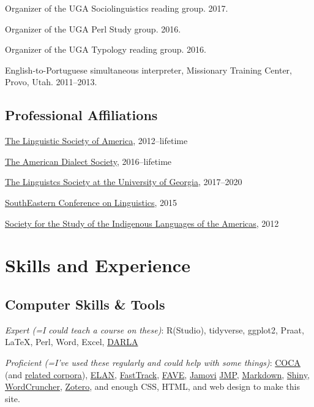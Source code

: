 \documentclass[
]{article}
\begin{document}
Organizer of the UGA Sociolinguistics reading group. 2017.

Organizer of the UGA Perl Study group. 2016.

Organizer of the UGA Typology reading group. 2016.

English-to-Portuguese simultaneous interpreter, Missionary Training
Center, Provo, Utah. 2011--2013.

\hypertarget{professional-affiliations}{%
\subsection{Professional Affiliations}\label{professional-affiliations}}

\href{http://www.linguisticsociety.org}{The Linguistic Society of
America}, 2012--lifetime

\href{http://www.americandialect.org}{The American Dialect Society},
2016--lifetime

\href{https://www.linguistics.uga.edu/lsuga}{The Linguistcs Society at
the University of Georgia}, 2017--2020

\href{http://secol.org}{SouthEastern Conference on Linguistics}, 2015

\href{http://www.ssila.org}{Society for the Study of the Indigenous
Languages of the Americas}, 2012

\hypertarget{skills-and-experience}{%
\section{Skills and Experience}\label{skills-and-experience}}

\hypertarget{computer-skills-tools}{%
\subsection{Computer Skills \& Tools}\label{computer-skills-tools}}

\emph{Expert (=I could teach a course on these)}: R(Studio), tidyverse,
ggplot2, Praat, LaTeX, Perl, Word, Excel,
\href{http://darla.dartmouth.edu}{DARLA}

\emph{Proficient (=I've used these regularly and could help with some
things)}: \href{http://corpus.byu.edu/coca/}{COCA} (and
\href{http://corpus.byu.edu}{related corpora}),
\href{https://archive.mpi.nl/tla/elan}{ELAN},
\href{https://github.com/santiagobarreda/FastTrack}{FastTrack},
\href{http://fave.ling.upenn.edu}{FAVE},
\href{https://www.jamovi.org}{Jamovi}
\href{http://www.jmp.com/en_us/home.html}{JMP},
\href{http://daringfireball.net/projects/markdown/}{Markdown},
\href{http://shiny.rstudio.com}{Shiny},
\href{http://www.wordcruncher.com/index.html}{WordCruncher},
\href{https://www.zotero.org}{Zotero}, and enough CSS, HTML, and web
design to make this site.
\end{document}
